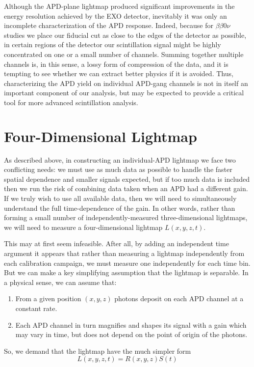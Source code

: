 Although the APD-plane lightmap produced significant improvements in the energy resolution achieved by the EXO detector, inevitably it was only an incomplete characterization of the APD response.  Indeed, because for $\beta\beta0\nu$ studies we place our fiducial cut as close to the edges of the detector as possible, in certain regions of the detector our scintillation signal might be highly concentrated on one or a small number of channels.  Summing together multiple channels is, in this sense, a lossy form of compression of the data, and it is tempting to see whether we can extract better physics if it is avoided.  Thus, characterizing the APD yield on individual APD-gang channels is not in itself an important component of our analysis, but may be expected to provide a critical tool for more advanced scintillation analysis.

\section{Four-Dimensional Lightmap}

As described above, in constructing an individual-APD lightmap we face two conflicting needs: we must use as much data as possible to handle the faster spatial dependence and smaller signals expected, but if too much data is included then we run the risk of combining data taken when an APD had a different gain.  If we truly wish to use all available data, then we will need to simultaneously understand the full time-dependence of the gain.  In other words, rather than forming a small number of independently-measured three-dimensional lightmaps, we will need to measure a four-dimensional lightmap $L(x,y,z,t)$.

This may at first seem infeasible.  After all, by adding an independent time argument it appears that rather than measuring a lightmap independently from each calibration campaign, we must measure one independently for each time bin.  But we can make a key simplifying assumption that the lightmap is separable.  In a physical sense, we can assume that:
\begin{enumerate}
\item From a given position $(x,y,z)$ photons deposit on each APD channel at a constant rate.
\item Each APD channel in turn magnifies and shapes its signal with a gain which may vary in time, but does not depend on the point of origin of the photons.
\end{enumerate}
So, we demand that the lightmap have the much simpler form
\begin{equation} \label{eq:SeparableLightmap}
L(x,y,z,t) = R(x,y,z)S(t)
\end{equation}

